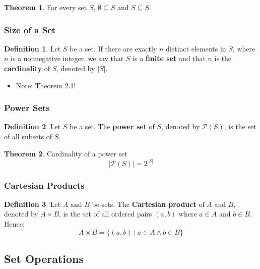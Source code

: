 \documentclass[article, 11pt]{article}
\theoremstyle{definition}
\newtheorem{theorem}{Theorem}[section]
\newtheorem{definition}{Definition}[section]
\newcommand{\powset}{\mathcal{P}} %
\begin{document}
    \begin{theorem}
        For every set $S$, $\emptyset \subseteq S$ and $S \subseteq S$.
    \end{theorem}
    \subsubsection{Size of a Set}
    \begin{definition}
        Let $S$ be a set. If there are exactly $n$ distinct elements in $S$, where $n$ is a nonnegative integer, we say that $S$ is a \textbf{finite set} and that $n$ is the \textbf{cardinality} of $S$, denoted by $|S|$.
        \begin{itemize}
            \item Note: Theorem 2.1!
        \end{itemize}
    \end{definition}
    \subsubsection{Power Sets}
    \begin{definition}
        Let $S$ be a set. The \textbf{power set} of $S$, denoted by $\powset(S)$, is the set of all subsets of $S$.
    \end{definition}
    \begin{theorem} Cardinality of a power set
        \begin{equation*}
            |\powset(S)| = 2^{|S|}
        \end{equation*}
    \end{theorem}
    \subsubsection{Cartesian Products}
    \begin{definition}
        Let $A$ and $B$ be sets. The \textbf{Cartesian product} of $A$ and $B$, denoted by $A \times B$, is the set of all ordered pairs $(a,b)$ where $a \in A$ and $b \in B$. Hence:
        \begin{equation*}
            A \times B = \{(a,b) \ | \ a \in A \land b \in B\}    
        \end{equation*}
    \end{definition}
    \subsection{Set Operations}
\end{document}
